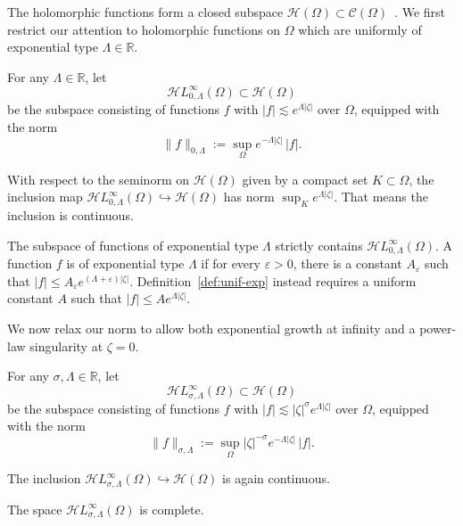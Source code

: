 \documentclass[final]{siamart220329}
\newcommand{\R}{\mathbb{R}}
\newcommand{\cont}{\mathcal{C}}
\newcommand{\holo}{\mathcal{H}}
\newcommand{\singexp}[2]{\mathcal{H}L^\infty_{#1, #2}}
\newcommand{\domain}{\Omega}
\begin{document}
The holomorphic functions form a closed subspace $\holo(\domain) \subset \cont(\domain)$~\cite[Proposition~3.14]{fnl-cpx-anal}. We first restrict our attention to holomorphic functions on $\domain$ which are uniformly of exponential type $\Lambda \in \R$.
\begin{definition}\label{def:unif-exp}
For any $\Lambda \in \R$, let
\[ \singexp{0}{\Lambda}(\domain) \subset \holo(\domain) \]
be the subspace consisting of functions $f$ with $|f| \lesssim e^{\Lambda|\zeta|}$ over $\domain$, equipped with the norm
\[ \|f\|_{0, \Lambda} := \sup_\Omega e^{-\Lambda|\zeta|}\,|f|. \]
\end{definition}
With respect to the seminorm on $\holo(\domain)$ given by a compact set $K \subset \domain$, the inclusion map $\singexp{0}{\Lambda}(\domain) \hookrightarrow \holo(\domain)$ has norm $\sup_K e^{\Lambda |\zeta|}$. That means the inclusion is continuous.
\begin{rmk}
The subspace of functions of exponential type $\Lambda$ strictly contains $\singexp{0}{\Lambda}(\domain)$. A function $f$ is of exponential type $\Lambda$ if for every $\varepsilon>0$, there is a constant $A_\varepsilon$ such that $|f|\le A_\varepsilon e^{(\Lambda+\varepsilon)|\zeta|}$. Definition~\ref{def:unif-exp} instead requires a uniform constant $A$ such that $|f| \le A e^{\Lambda|\zeta|}$.\end{rmk}
We now relax our norm to allow both exponential growth at infinity and a power-law singularity at $\zeta = 0$.
\begin{definition}
For any $\sigma, \Lambda \in \R$, let
\[ \singexp{\sigma}{\Lambda}(\domain) \subset \holo(\domain) \]
be the subspace consisting of functions $f$ with $|f| \lesssim |\zeta|^\sigma e^{\Lambda|\zeta|}$ over $\domain$, equipped with the norm
\[ \|f\|_{\sigma,\Lambda} := \sup_\Omega |\zeta|^{-\sigma} e^{-\Lambda|\zeta|}\,|f|. \]
\end{definition}
The inclusion $\singexp{\sigma}{\Lambda}(\domain) \hookrightarrow \holo(\domain)$ is again continuous.
\begin{proposition}\label{exp-complete}
The space $\singexp{\sigma}{\Lambda}(\domain)$ is complete.
\end{proposition}
\end{document}
